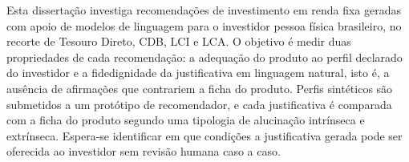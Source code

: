 
\begin{resumo}
Esta dissertação investiga recomendações de investimento em renda fixa geradas
com apoio de modelos de linguagem para o investidor pessoa física brasileiro,
no recorte de Tesouro Direto, CDB, LCI e LCA. O objetivo é medir duas
propriedades de cada recomendação: a adequação do produto ao perfil declarado
do investidor e a fidedignidade da justificativa em linguagem natural, isto é,
a ausência de afirmações que contrariem a ficha do produto. Perfis sintéticos
são submetidos a um protótipo de recomendador, e cada justificativa é comparada
com a ficha do produto segundo uma tipologia de alucinação intrínseca e
extrínseca. Espera-se identificar em que condições a justificativa gerada pode
ser oferecida ao investidor sem revisão humana caso a caso.
\end{resumo}
